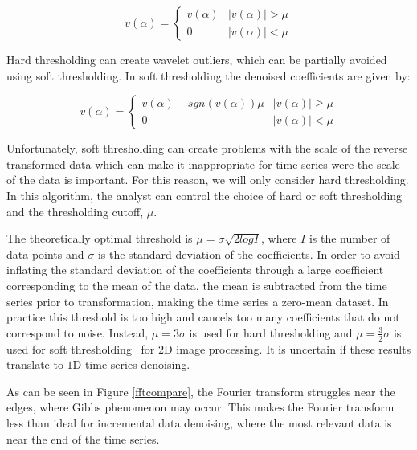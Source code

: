 \documentclass[11pt]{article}
\theoremstyle{definition}
\begin{document}
\begin{displaymath}
v\left(\alpha\right) = 
\begin{cases}
v\left(\alpha\right) & \lvert v\left(\alpha\right)\rvert > \mu \\
0 & \lvert v\left(\alpha\right)\rvert < \mu
\end{cases}
\end{displaymath}

Hard thresholding can create wavelet outliers, which can be partially avoided using soft thresholding. In soft thresholding the denoised coefficients are given by:

\begin{displaymath}
v\left(\alpha\right) = 
\begin{cases}
v\left(\alpha\right) - sgn\left(v\left(\alpha\right)\right)\mu & \lvert v\left(\alpha\right)\rvert \geq \mu \\
0 & \lvert v\left(\alpha\right)\rvert < \mu
\end{cases}
\end{displaymath}

Unfortunately, soft thresholding can create problems with the scale of the reverse transformed data which can make it inappropriate for time series were the scale of the data is important. For this reason, we will only consider hard thresholding. In this algorithm, the analyst can control the choice of hard or soft thresholding and the thresholding cutoff, $\mu$.

The theoretically optimal threshold is $\mu = \sigma \sqrt{2 log I}$, where $I$ is the number of data points and $\sigma$ is the standard deviation of the coefficients. In order to avoid inflating the standard deviation of the coefficients through a large coefficient corresponding to the mean of the data, the mean is subtracted from the time series prior to transformation, making the time series a zero-mean dataset. In practice this threshold is too high and cancels too many coefficients that do not correspond to noise. Instead, $\mu = 3 \sigma$ is used for hard thresholding and $\mu = \frac{3}{2} \sigma$ is used for soft thresholding~\cite{Buades05} for $2$D image processing. It is uncertain if these results translate to $1$D time series denoising.

As can be seen in Figure \ref{fftcompare}, the Fourier transform struggles near the edges, where Gibbs phenomenon may occur. This makes the Fourier transform less than ideal for incremental data denoising, where the most relevant data is near the end of the time series.
\end{document}
